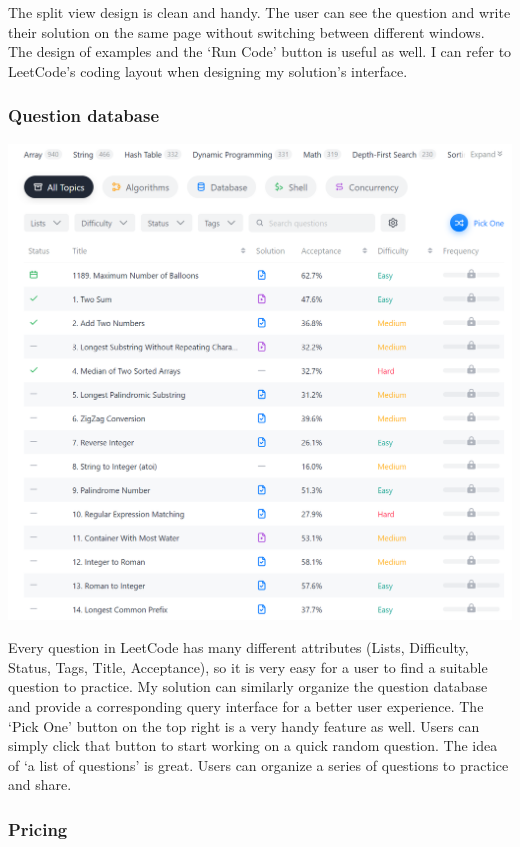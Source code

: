 \documentclass[a4paper]{report}
\begin{document}
The split view design is clean and handy. The user can see the question and write their solution on the same page without switching between different windows. The design of examples and the `Run Code' button is useful as well. I can refer to LeetCode's coding layout when designing my solution's interface.

\subsubsection{Question database}

\includegraphics[width=\linewidth]{LeetCode-Problems}

Every question in LeetCode has many different attributes (Lists, Difficulty, Status, Tags, Title, Acceptance), so it is very easy for a user to find a suitable question to practice. My solution can similarly organize the question database and provide a corresponding query interface for a better user experience. The `Pick One' button on the top right is a very handy feature as well. Users can simply click that button to start working on a quick random question. The idea of `a list of questions' is great. Users can organize a series of questions to practice and share.

\subsubsection{Pricing}
\end{document}
